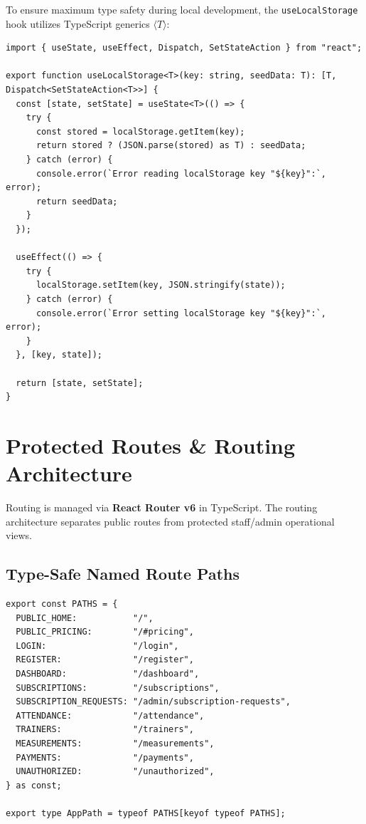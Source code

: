 \documentclass[11pt,a4paper]{article}
\begin{document}
To ensure maximum type safety during local development, the \texttt{useLocalStorage} hook utilizes TypeScript generics $\langle T \rangle$:

\begin{lstlisting}[caption={Hooks/useLocalStorage.ts (TypeScript Generic Hook)}]
import { useState, useEffect, Dispatch, SetStateAction } from "react";

export function useLocalStorage<T>(key: string, seedData: T): [T, Dispatch<SetStateAction<T>>] {
  const [state, setState] = useState<T>(() => {
    try {
      const stored = localStorage.getItem(key);
      return stored ? (JSON.parse(stored) as T) : seedData;
    } catch (error) {
      console.error(`Error reading localStorage key "${key}":`, error);
      return seedData;
    }
  });

  useEffect(() => {
    try {
      localStorage.setItem(key, JSON.stringify(state));
    } catch (error) {
      console.error(`Error setting localStorage key "${key}":`, error);
    }
  }, [key, state]);

  return [state, setState];
}
\end{lstlisting}

\newpage
\section{Protected Routes \& Routing Architecture}

Routing is managed via \textbf{React Router v6} in TypeScript. The routing architecture separates public routes from protected staff/admin operational views.

\subsection{Type-Safe Named Route Paths}

\begin{lstlisting}[caption={Routing/routePaths.ts}]
export const PATHS = {
  PUBLIC_HOME:           "/",
  PUBLIC_PRICING:        "/#pricing",
  LOGIN:                 "/login",
  REGISTER:              "/register",
  DASHBOARD:             "/dashboard",
  SUBSCRIPTIONS:         "/subscriptions",
  SUBSCRIPTION_REQUESTS: "/admin/subscription-requests",
  ATTENDANCE:            "/attendance",
  TRAINERS:              "/trainers",
  MEASUREMENTS:          "/measurements",
  PAYMENTS:              "/payments",
  UNAUTHORIZED:          "/unauthorized",
} as const;

export type AppPath = typeof PATHS[keyof typeof PATHS];
\end{lstlisting}
\end{document}
